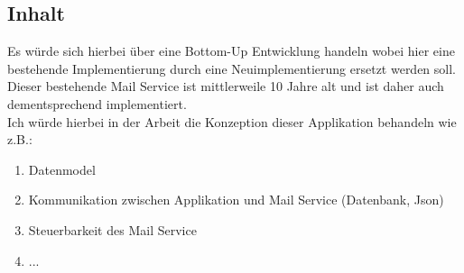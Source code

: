 \documentclass[11pt, a4paper, twoside]{article}   	%
\begin{document}
\subsection{Inhalt}
Es würde sich hierbei über eine Bottom-Up Entwicklung handeln wobei hier eine bestehende Implementierung durch eine Neuimplementierung ersetzt werden soll.\\
Dieser bestehende Mail Service ist mittlerweile 10 Jahre alt und ist daher auch dementsprechend implementiert.\\
Ich würde hierbei in der Arbeit die Konzeption dieser Applikation behandeln wie z.B.:
\begin{enumerate}
	\item Datenmodel
	\item Kommunikation zwischen Applikation und Mail Service (Datenbank, Json)
	\item Steuerbarkeit des Mail Service
	\item ...
\end{enumerate}
\newpage
\end{document}
